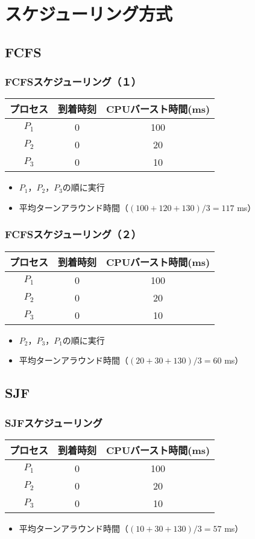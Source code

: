 \documentclass{beamer}                   %
\begin{document}
\section{スケジューリング方式}
\subsection{FCFS}
\begin{frame}
  \frametitle{FCFSスケジューリング（１）}
  \small\begin{tabular}{c c c}
    プロセス & 到着時刻 & CPUバースト時間(ms) \\
    \hline
    $P_1$    & 0 & 100 \\
    $P_2$    & 0 & 20 \\
    $P_3$    & 0 & 10 \\
  \end{tabular}
  \begin{itemize}
    \item $P_1$，$P_2$，$P_3$の順に実行
    \item 平均ターンアラウンド時間（$(100+120+130) / 3 = 117$ ms）
  \end{itemize}
\end{frame}

\begin{frame}
  \frametitle{FCFSスケジューリング（２）}
  \small\begin{tabular}{c c c}
    プロセス & 到着時刻 & CPUバースト時間(ms) \\
    \hline
    $P_1$    & 0 & 100 \\
    $P_2$    & 0 & 20 \\
    $P_3$    & 0 & 10 \\
  \end{tabular}
  \begin{itemize}
    \item $P_2$，$P_3$，$P_1$の順に実行
    \item 平均ターンアラウンド時間（$(20+30+130) / 3 = 60$ ms）
  \end{itemize}
\end{frame}

\subsection{SJF}
\begin{frame}
  \frametitle{SJFスケジューリング}
  \small\begin{tabular}{c c c}
    プロセス & 到着時刻 & CPUバースト時間(ms) \\
    \hline
    $P_1$    & 0 & 100 \\
    $P_2$    & 0 & 20 \\
    $P_3$    & 0 & 10 \\
  \end{tabular}
  \begin{itemize}
    \item 平均ターンアラウンド時間（$(10+30+130) / 3 = 57$ ms）
  \end{itemize}
\end{frame}
\end{document}
